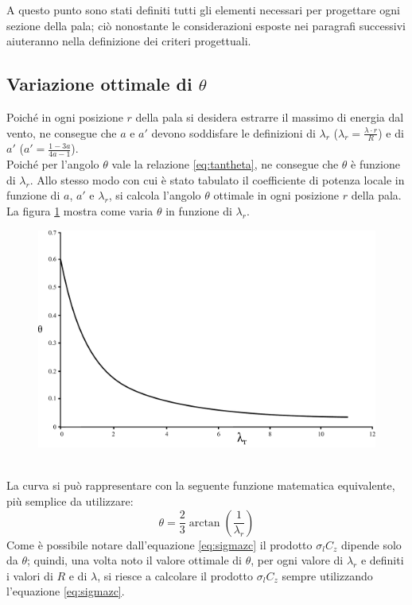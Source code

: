 A questo punto sono stati definiti tutti gli elementi necessari per progettare ogni sezione della pala; ciò nonostante le considerazioni esposte nei paragrafi successivi aiuteranno nella definizione dei criteri progettuali.

\subsection{Variazione ottimale di $\theta$}
Poiché in ogni posizione $r$ della pala si desidera estrarre il massimo di energia dal vento, ne consegue che $a$ e $a'$ devono soddisfare le definizioni di $\lambda_r$ ($\lambda_r = \frac{\lambda \cdot r}{R}$) e di $a'$ ($a' = \frac{1 - 3a}{4a -1}$).\\
Poiché per l'angolo $\theta$ vale la relazione \ref{eq:tantheta}, ne consegue che $\theta$ è funzione di $\lambda_r$. Allo stesso modo con cui è stato tabulato il coefficiente di potenza locale in funzione di $a$, $a'$ e $\lambda_r$, si calcola l'angolo $\theta$ ottimale in ogni posizione $r$ della pala. La figura \ref{fig:lambdatheta} mostra come varia $\theta$ in funzione di $\lambda_r$.
\begin{figure}[h!]
\centering
  \includegraphics[width=.7\textwidth]{fig/lambdatheta.pdf}
\caption{}
\label{fig:lambdatheta}
\end{figure}
\\La curva si può rappresentare con la seguente funzione matematica equivalente, più semplice da utilizzare:
\begin{equation}
\theta = \frac{2}{3} \arctan \left( \frac{1}{\lambda_r} \right)
\end{equation}
Come è possibile notare dall'equazione \ref{eq:sigmazc} il prodotto $\sigma_l C_z$ dipende solo da $\theta$; quindi, una volta noto il valore ottimale di $\theta$, per ogni valore di $\lambda_r$ e definiti i valori di $R$ e di $\lambda$, si riesce a calcolare il prodotto $\sigma_l C_z$ sempre utilizzando l'equazione \ref{eq:sigmazc}.\\


